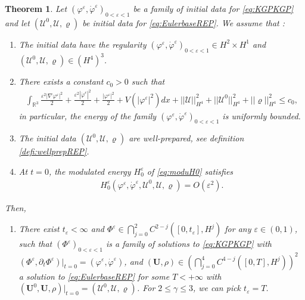 \documentclass[a4paper, 15pt]{article}
\numberwithin{equation}{section}
\newtheorem{unTheorem}{Theorem}[section]
\begin{document}
\begin{unTheorem}
\label{unTheorem:TH1mainth}
    Let $(\varphi^\varepsilon,\dot{\varphi}^\varepsilon)_{0<\varepsilon<1}$ be a family of initial data for \eqref{eq:KGPKGP} and let $(\mathscr{U}^0,\mathscr{U},\varrho)$ be initial data for \eqref{eq:EulerbaseREP}. We assume that :
\begin{enumerate}
\label{enumerate:listmainth}
    \item \label{item:item1mainth}The initial data have the regularity $(\varphi^\varepsilon,\dot{\varphi}^\varepsilon)_{0<\varepsilon<1}\in H^{2}\times H^{1}$ and $(\mathscr{U}^0,\mathscr{U},\varrho)\in(H^{4})^3$. 
     \item \label{item:item2mainth}There exists a constant $c_0>0$ such that 
     \begin{align}
         \int_{\mathbb{R}^3}{\frac{\varepsilon^2|\nabla\varphi^\varepsilon|^2}{2}+\frac{\varepsilon^2|\dot{\varphi}^\varepsilon|^2}{2}+\frac{|\varphi^\varepsilon|^2}{2}+V(|\varphi^\varepsilon|^2)dx}+||\mathscr{U}||_{H^4}^2+||\mathscr{U}^0||_{H^4}^2+||\varrho||_{H^4}^2\leq c_0,
     \end{align}
     in particular, the energy of the family $(\varphi^\varepsilon,\dot{\varphi}^\varepsilon)_{0<\varepsilon<1}$ is uniformly bounded.
    \item \label{item:item3mainth}The initial data $(\mathscr{U}^0,\mathscr{U},\varrho)$ are well-prepared, see definition \ref{defi:wellprepREP}.
    \item \label{item:item4mainth}At $t=0$, the modulated energy $H^\varepsilon_0$ of \eqref{eq:moduH0} satisfies 
    \begin{align}     
\label{eq:H0smallmainth}
H^\varepsilon_0(\varphi^\varepsilon,\dot{\varphi}^\varepsilon,\mathscr{U}^0,\mathscr{U},\varrho)=O(\varepsilon^2).
    \end{align}
\end{enumerate}
Then, 
\begin{enumerate}[label=\roman*)]
 \label{itemize:pointsmainth}
	\item  \label{item:point1mainth} There exist $t_\varepsilon<\infty$ and  $\Phi^\varepsilon\in\bigcap^{2}_{j=0}C^{2-j}([0,t_\varepsilon],H^{j})$ for any $\varepsilon\in(0,1)$, such that $(\Phi^\varepsilon)_{0<\varepsilon<1}$ is a family of solutions to \eqref{eq:KGPKGP} with $(\Phi^\varepsilon,\partial_t\Phi^\varepsilon)|_{t=0}=(\varphi^\varepsilon,\dot{\varphi}^\varepsilon)$, and $(\textbf{U},\rho)\in(\bigcap^{4}_{j=0}C^{4-j}([0,T],H^{j}))^2$ a solution to \eqref{eq:EulerbaseREP} for some $T<+\infty$ with $(\textbf{U}^0,\textbf{U},\rho)|_{t=0}=(\mathscr{U}^0,\mathscr{U},\varrho)$. For $2\leq\gamma\leq3$, we can pick $t_\varepsilon=T$.

\end{enumerate}
\end{unTheorem}
\end{document}
